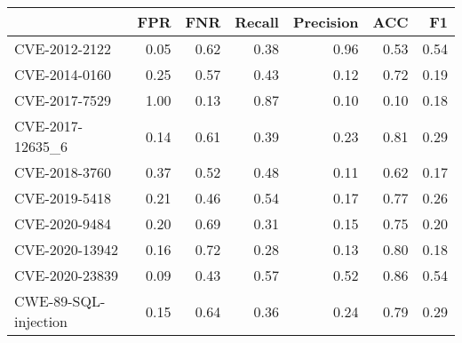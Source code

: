 \begin{tabular}{lrrrrrr}
\toprule
{} &  FPR &  FNR &  Recall &  Precision &  ACC &   F1 \\
\midrule
CVE-2012-2122        & 0.05 & 0.62 &    0.38 &       0.96 & 0.53 & 0.54 \\
CVE-2014-0160        & 0.25 & 0.57 &    0.43 &       0.12 & 0.72 & 0.19 \\
CVE-2017-7529        & 1.00 & 0.13 &    0.87 &       0.10 & 0.10 & 0.18 \\
CVE-2017-12635\_6     & 0.14 & 0.61 &    0.39 &       0.23 & 0.81 & 0.29 \\
CVE-2018-3760        & 0.37 & 0.52 &    0.48 &       0.11 & 0.62 & 0.17 \\
CVE-2019-5418        & 0.21 & 0.46 &    0.54 &       0.17 & 0.77 & 0.26 \\
CVE-2020-9484        & 0.20 & 0.69 &    0.31 &       0.15 & 0.75 & 0.20 \\
CVE-2020-13942       & 0.16 & 0.72 &    0.28 &       0.13 & 0.80 & 0.18 \\
CVE-2020-23839       & 0.09 & 0.43 &    0.57 &       0.52 & 0.86 & 0.54 \\
CWE-89-SQL-injection & 0.15 & 0.64 &    0.36 &       0.24 & 0.79 & 0.29 \\
\bottomrule
\end{tabular}
